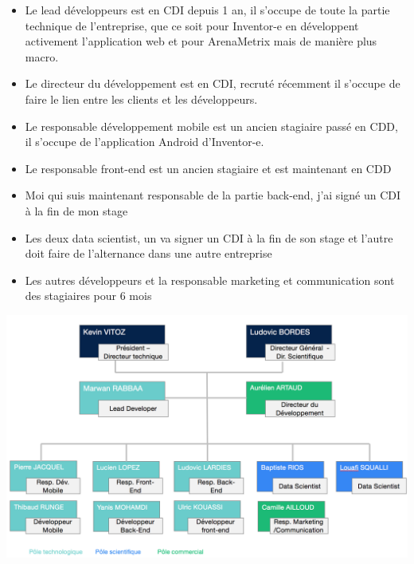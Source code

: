 \begin{itemize}
  \item[\textbullet] Le lead développeurs est en CDI depuis 1 an, il s'occupe de toute la partie technique de l'entreprise, que ce soit pour Inventor-e en développent activement l'application web et pour ArenaMetrix mais de manière plus macro.

  \item[\textbullet] Le directeur du développement est en CDI, recruté récemment il s'occupe de faire le lien entre les clients et les développeurs.

  \item[\textbullet] Le responsable développement mobile est un ancien stagiaire passé en CDD, il s'occupe de l'application Android d'Inventor-e.
  
  \item[\textbullet] Le responsable front-end est un ancien stagiaire et est maintenant en CDD
  
  \item[\textbullet] Moi qui suis maintenant responsable de la partie back-end, j'ai signé un CDI à la fin de mon stage
  
  \item[\textbullet] Les deux data scientist, un va signer un CDI à la fin de son stage et l'autre doit faire de l'alternance dans une autre entreprise
           
  \item[\textbullet]Les autres développeurs et la responsable marketing et communication sont des stagiaires pour 6 mois

\end{itemize}

\begin{center}
\includegraphics[scale=0.57]{images/organigamme.png}
\label{organigramme}
\end{center}


